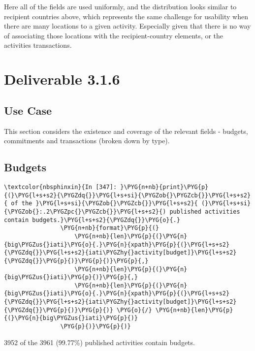\documentclass[letterpaper,10pt,english]{sphinxmanual}
\begin{document}
Here all of the fields are used uniformly, and the distribution looks
similar to recipient countries above, which represents the same
challenge for usability when there are many locations to a given
activity. Especially given that there is no way of associating those
locations with the recipient-country elements, or the activities
transactions.


\section{Deliverable 3.1.6}
\label{\detokenize{Global Affairs Canada - Compliance Report:Deliverable-3.1.6}}

\subsection{Use Case}
\label{\detokenize{Global Affairs Canada - Compliance Report:Use-Case}}

This section considers the existence and coverage of the relevant fields
- budgets, commitments and transactions (broken down by type).


\subsection{Budgets}
\label{\detokenize{Global Affairs Canada - Compliance Report:Budgets}}
\begin{Verbatim}[commandchars=\\\{\}]
\textcolor{nbsphinxin}{In [347]: }\PYG{n+nb}{print}\PYG{p}{(}\PYG{l+s+s2}{\PYGZdq{}}\PYG{l+s+si}{\PYGZob{}\PYGZcb{}}\PYG{l+s+s2}{ of the }\PYG{l+s+si}{\PYGZob{}\PYGZcb{}}\PYG{l+s+s2}{ (}\PYG{l+s+si}{\PYGZob{}:.2\PYGZpc{}\PYGZcb{}}\PYG{l+s+s2}{) published activities contain budgets.}\PYG{l+s+s2}{\PYGZdq{}}\PYG{o}{.}
                \PYG{n+nb}{format}\PYG{p}{(}
                    \PYG{n+nb}{len}\PYG{p}{(}\PYG{n}{big\PYGZus{}iati}\PYG{o}{.}\PYG{n}{xpath}\PYG{p}{(}\PYG{l+s+s2}{\PYGZdq{}}\PYG{l+s+s2}{iati\PYGZhy{}activity[budget]}\PYG{l+s+s2}{\PYGZdq{}}\PYG{p}{)}\PYG{p}{)}\PYG{p}{,}
                    \PYG{n+nb}{len}\PYG{p}{(}\PYG{n}{big\PYGZus{}iati}\PYG{p}{)}\PYG{p}{,}
                    \PYG{n+nb}{len}\PYG{p}{(}\PYG{n}{big\PYGZus{}iati}\PYG{o}{.}\PYG{n}{xpath}\PYG{p}{(}\PYG{l+s+s2}{\PYGZdq{}}\PYG{l+s+s2}{iati\PYGZhy{}activity[budget]}\PYG{l+s+s2}{\PYGZdq{}}\PYG{p}{)}\PYG{p}{)} \PYG{o}{/} \PYG{n+nb}{len}\PYG{p}{(}\PYG{n}{big\PYGZus{}iati}\PYG{p}{)}
                \PYG{p}{)}\PYG{p}{)}
\end{Verbatim}
%
\begin{OriginalVerbatim}[commandchars=\\\{\}]
3952 of the 3961 (99.77\%) published activities contain budgets.
\end{OriginalVerbatim}
\relax
\end{document}
